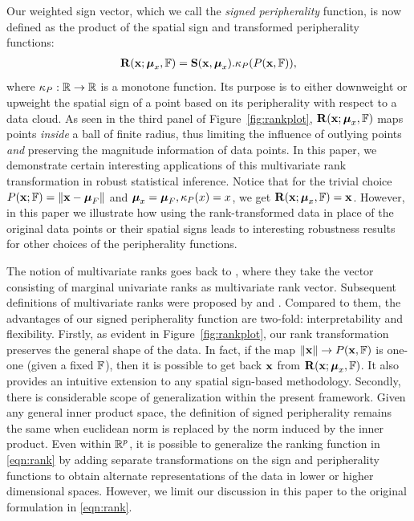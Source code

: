 Our weighted sign vector, which we call the {\it signed peripherality} function, is now defined as the product of the spatial sign and transformed peripherality functions:
%
\begin{align}\label{eqn:rank}
{\mathbf{R}} ({\bf{x}}; {\boldsymbol{\mu}}_x, {\mathbb{F}}) = {\mathbf{S}}({\bf{x}}, {\boldsymbol{\mu}}_x). \kappa_P( P({\bf{x}}, {\mathbb{F}})),
\end{align}
%
where $\kappa_P: {\mathbb{R}} \rightarrow {\mathbb{R}}$ is a monotone function. Its purpose is to either downweight or upweight the spatial sign of a point based on its peripherality with respect to a data cloud. As seen in the third panel of Figure~\ref{fig:rankplot}, ${\mathbf{R}} ({\bf{x}}; {\boldsymbol{\mu}}_x, {\mathbb{F}})$ maps points {\it inside} a ball of finite radius, thus limiting the influence of outlying points {\it and} preserving the magnitude information of data points. In this paper, we demonstrate certain interesting applications of this multivariate rank transformation in robust statistical inference. Notice that for the trivial choice $P( {\bf{x}}; {\mathbb{F}}) = \| {\bf{x}} - {\boldsymbol{\mu}}_{F} \|$ and ${\boldsymbol{\mu}}_x = {\boldsymbol{\mu}}_F, \kappa_P(x)=x$, we get ${\mathbf{R}} ({\bf{x}}; {\boldsymbol{\mu}}_x, {\mathbb{F}}) = {\bf{x}}$. However, in this paper we illustrate how using the rank-transformed data in place of the original data points or their spatial signs leads to interesting robustness results for other choices of the peripherality functions.

The notion of multivariate ranks goes back to \cite{PuriSenBook}, where they take the vector consisting of marginal univariate ranks as multivariate rank vector. Subsequent definitions of multivariate ranks were proposed by \cite{MottonenOja95,HallinPaindaveine02} and \cite{Chernozhukov14}. Compared to them, the advantages of our signed peripherality function are two-fold: interpretability and flexibility. Firstly, as evident in Figure~\ref{fig:rankplot}, our rank transformation preserves the general shape of the data. In fact, if the map $\| {\bf{x}} \| \rightarrow P({\bf{x}}, {\mathbb{F}})$ is one-one (given a fixed ${\mathbb{F}}$), then it is possible to get back ${\bf{x}}$ from ${\mathbf{R}} ({\bf{x}}; {\boldsymbol{\mu}}_x, {\mathbb{F}})$. It also provides an intuitive extension to any spatial sign-based methodology. Secondly, there is considerable scope of generalization within the present framework. Given any general inner product space, the definition of signed peripherality remains the same when euclidean norm is replaced by the norm induced by the inner product. Even within ${\mathbb{R}}^p$, it is possible to generalize the ranking function in \eqref{eqn:rank} by adding separate transformations on the sign and peripherality functions to obtain alternate representations of the data in lower or higher dimensional spaces. However, we limit our discussion in this paper to the original formulation in \eqref{eqn:rank}.

